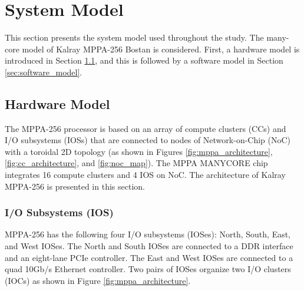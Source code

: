\documentclass{sig-alternate-05-2015}
\begin{document}
\section{System Model}
\label{sec:system_model}
This section presents the system model used throughout the study.
The many-core model of Kalray MPPA-256 Bostan is considered.
First, a hardware model is introduced in Section \ref{sec:hardware_model}, and this is followed by a software model in Section \ref{sec:software_model}.

\subsection{Hardware Model}
\label{sec:hardware_model}
The MPPA-256 processor is based on an array of compute clusters (CCs) and I/O subsystems (IOSs) that are connected to nodes of Network-on-Chip (NoC) with a toroidal 2D topology 
(as shown in Figures \ref{fig:mppa_architecture}, \ref{fig:cc_architecture}, and \ref{fig:noc_map}).
The MPPA MANYCORE chip integrates 16 compute clusters and 4 IOS on NoC.
The architecture of Kalray MPPA-256 is presented in this section.

\subsubsection{I/O Subsystems (IOS)}
\label{sec:ios}
MPPA-256 has the following four I/O subsystems (IOSes): North, South, East, and West IOSes.
The North and South IOSes are connected to a DDR interface and an eight-lane PCIe controller.
The East and West IOSes are connected to a quad 10Gb/s Ethernet controller.
Two pairs of IOSes organize two I/O clusters (IOCs) as shown in Figure \ref{fig:mppa_architecture}.
\end{document}
